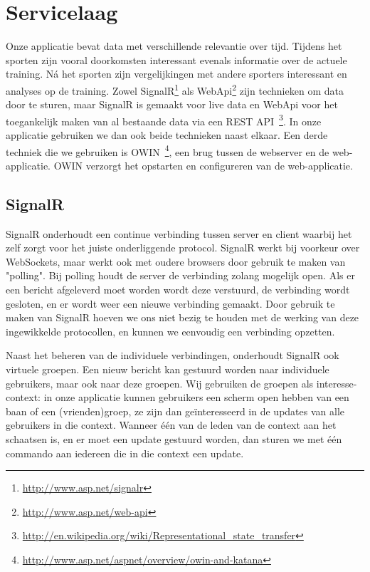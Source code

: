 \section{Servicelaag}
Onze applicatie bevat data met verschillende relevantie over tijd. Tijdens het sporten zijn vooral doorkomsten interessant evenals informatie over de actuele training. Ná het sporten zijn vergelijkingen met andere sporters interessant en analyses op de training. Zowel SignalR\footnote{\url{http://www.asp.net/signalr}} als WebApi\footnote{\url{http://www.asp.net/web-api}} zijn technieken om data door te sturen, maar SignalR is gemaakt voor live data en WebApi voor het toegankelijk maken van al bestaande data via een REST API~\footnote{\url{http://en.wikipedia.org/wiki/Representational_state_transfer}}. In onze applicatie gebruiken we dan ook beide technieken naast elkaar. Een derde techniek die we gebruiken is OWIN~\footnote{\url{http://www.asp.net/aspnet/overview/owin-and-katana}}, een brug tussen de webserver en de web-applicatie. OWIN verzorgt het opstarten en configureren van de web-applicatie.

\subsection{SignalR}
SignalR onderhoudt een continue verbinding tussen server en client waarbij het zelf zorgt voor het juiste onderliggende protocol. SignalR werkt bij voorkeur over WebSockets, maar werkt ook met oudere browsers door gebruik te maken van "polling". Bij polling houdt de server de verbinding zolang mogelijk open. Als er een bericht afgeleverd moet worden wordt deze verstuurd, de verbinding wordt gesloten, en er wordt weer een nieuwe verbinding gemaakt. Door gebruik te maken van SignalR hoeven we ons niet bezig te houden met de werking van deze ingewikkelde protocollen, en kunnen we eenvoudig een verbinding opzetten.

Naast het beheren van de individuele verbindingen, onderhoudt SignalR ook virtuele groepen. Een nieuw bericht kan gestuurd worden naar individuele gebruikers, maar ook naar deze groepen. Wij gebruiken de groepen als interesse-context: in onze applicatie kunnen gebruikers een scherm open hebben van een baan of een (vrienden)groep, ze zijn dan geïnteresseerd in de updates van alle gebruikers in die context. Wanneer één van de leden van de context aan het schaatsen is, en er moet een update gestuurd worden, dan sturen we met één commando aan iedereen die in die context een update.

